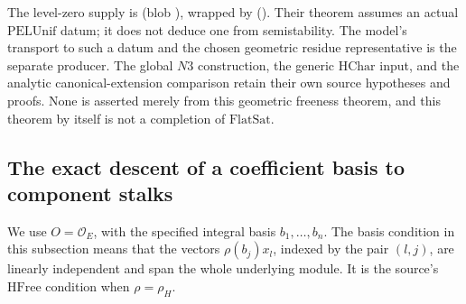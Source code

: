 The level-zero supply is
\href{https://github.com/ChristianKudeba/alpoge-rh-verification/blob/alpoge-source-7cbf7a0c/src/Development/WeilBound/CoreStatements/HodgeTatePoints/CgUnif.lean}
{}
(blob ),
wrapped by
\href{https://github.com/ChristianKudeba/alpoge-rh-verification/blob/alpoge-source-7cbf7a0c/src/Development/AutomorphicSpectrum/Proofs/GeometryProofs/PelUniformisedGeometricFree.lean}
{}
().
Their theorem assumes an actual \(\mathrm{PELUnif}\) datum;
it does not deduce one from semistability.
The model's transport to such a datum and the chosen geometric
residue representative is the separate
 producer.
The global \(N3\) construction, the generic
\(\mathrm{HChar}\) input, and the analytic canonical-extension
comparison retain their own source hypotheses and proofs.
None is asserted merely from this geometric freeness theorem,
and this theorem by itself is not a completion of
\(\mathrm{FlatSat}\).


\subsection{The exact descent of a coefficient basis to component stalks}
\label{subsec:faithful-free-stalk-transport}

We use \(O=\mathcal O_E\), with the specified integral basis
\(b_1,\ldots,b_n\).  The basis condition in this subsection means
that the vectors \(\rho(b_j)x_l\), indexed by the pair \((l,j)\),
are linearly independent and span the whole underlying module.
It is the source's \(\mathrm{HFree}\) condition when
\(\rho=\rho_H\).

